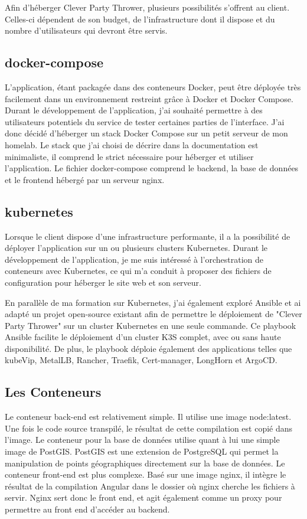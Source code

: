 Afin d'héberger Clever Party Thrower, plusieurs possibilités s'offrent au client.
Celles-ci dépendent de son budget, de l'infrastructure dont il dispose et du nombre d'utilisateurs qui devront être servis.

\subsection{docker-compose}\label{subsec:docker-compose}
L'application, étant packagée dans des conteneurs Docker, peut être déployée très facilement dans un environnement restreint grâce à Docker et Docker Compose.
Durant le développement de l'application, j'ai souhaité permettre à des utilisateurs potentiels du service de tester certaines parties de l'interface.
J'ai donc décidé d'héberger un stack Docker Compose sur un petit serveur de mon homelab.
Le stack que j'ai choisi de décrire dans la documentation est minimaliste, il comprend le strict nécessaire pour héberger et utiliser l'application.
Le fichier docker-compose comprend le backend, la base de données et le frontend hébergé par un serveur nginx.

\subsection{kubernetes}\label{subsec:kubernetes}
Lorsque le client dispose d'une infrastructure performante, il a la possibilité de déployer l'application sur un ou plusieurs clusters Kubernetes.
Durant le développement de l'application, je me suis intéressé à l'orchestration de conteneurs avec Kubernetes, ce qui m'a conduit à proposer des fichiers de configuration pour héberger le site web et son serveur.

En parallèle de ma formation sur Kubernetes, j'ai également exploré Ansible et ai adapté un projet open-source existant afin de permettre le déploiement de "Clever Party Thrower" sur un cluster Kubernetes en une seule commande.
Ce playbook Ansible facilite le déploiement d'un cluster K3S complet, avec ou sans haute disponibilité.
De plus, le playbook déploie également des applications telles que kubeVip, MetalLB, Rancher, Traefik, Cert-manager, LongHorn et ArgoCD.

\subsection{Les Conteneurs}\label{subsec:les-conteneurs}
Le conteneur back-end est relativement simple.
Il utilise une image node:latest.
Une fois le code source transpilé, le résultat de cette compilation est copié dans l'image.
Le conteneur pour la base de données utilise quant à lui une simple image de PostGIS. PostGIS est une extension de PostgreSQL qui permet la manipulation de points géographiques directement sur la base de données.
Le conteneur front-end est plus complexe.
Basé sur une image nginx, il intègre le résultat de la compilation Angular dans le dossier où nginx cherche les fichiers à servir.
Nginx sert donc le front end, et agit également comme un proxy pour permettre au front end d'accéder au backend.

